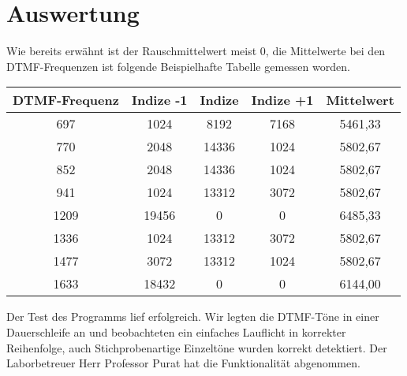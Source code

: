 \section{Auswertung}\label{ADTMF}
Wie bereits erwähnt ist der Rauschmittelwert meist 0, die Mittelwerte bei den DTMF-Frequenzen ist folgende Beispielhafte Tabelle gemessen worden.\\
\begin{table}[H]
	\centering
	\begin{tabular}{|c|c|c|c|c|}
\hline 
DTMF-Frequenz & Indize -1 & Indize & Indize +1 & Mittelwert \\ 
\hline 
697 & 1024
 & 8192
 & 7168
 & 5461,33
 \\ 
\hline 
770 & 2048
 & 14336
 & 1024
 & 5802,67
 \\ 
\hline 
852 & 2048
 & 14336
 & 1024
 & 5802,67 \\ 
\hline 
941 &1024
 & 13312
 & 3072
 & 5802,67
\\ 
\hline 
1209 &19456
 & 0 & 0 & 6485,33
 \\ 
\hline 
1336 & 1024
 & 13312
 & 3072
 & 5802,67
 \\ 
\hline 
1477 & 3072
 & 13312
 & 1024
& 5802,67
 \\ 
\hline 
1633 & 18432
 & 0 &0 &6144,00
 \\ 
\hline 
\end{tabular} 
\end{table}

Der Test des Programms lief erfolgreich. Wir legten die DTMF-Töne in einer Dauerschleife an und beobachteten ein einfaches Lauflicht in korrekter Reihenfolge, auch Stichprobenartige Einzeltöne wurden korrekt detektiert. Der Laborbetreuer Herr Professor Purat hat die Funktionalität abgenommen.\\
